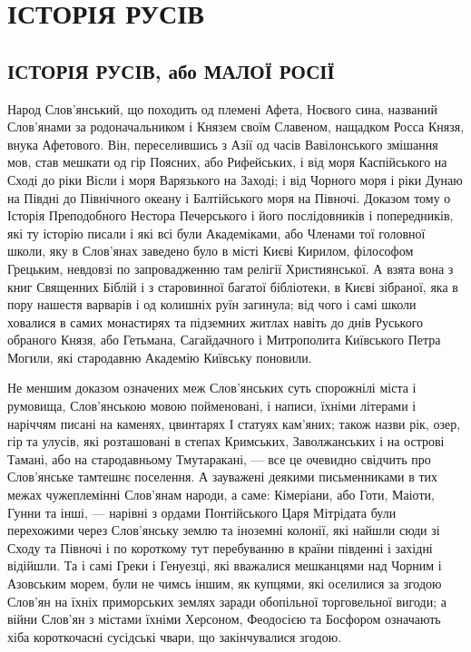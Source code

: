  
 
 
 
 

\chapter{ІСТОРІЯ РУСІВ}
\label{sec:books.istoria_rusiv}




\section{ІСТОРІЯ РУСІВ, або МАЛОЇ РОСІЇ}

Народ Слов'янський, що походить од племені Афета, Ноєвого сина, названий
Слов'янами за родоначальником і Князем своїм Славеном, нащадком Росса Князя,
внука Афетового. Він, переселившись з Азії од часів Вавілонського змішання мов,
став мешкати од гір Поясних, або Рифейських, і від моря Каспійського на Сході
до ріки Вісли і моря Варязького на Заході; і від Чорного моря і ріки Дунаю на
Півдні до Північного океану і Балтійського моря на Півночі. Доказом тому о
Історія Преподобного Нестора Печерського і його послідовників і попередників,
які ту історію писали і які всі були Академіками, або Членами тої головної
школи, яку в Слов'янах заведено було в місті Києві Кирилом, філософом Грецьким,
невдовзі по запровадженню там релігії Християнської. А взята вона з книг
Священних Біблій і з старовинної багатої бібліотеки, в Києві зібраної, яка в
пору нашестя варварів і од колишніх руїн загинула; від чого і самі школи
ховалися в самих монастирях та підземних житлах навіть до днів Руського
обраного Князя, або Гетьмана, Сагайдачного і Митрополита Київського Петра
Могили, які стародавню Академію Київську поновили.

Не меншим доказом означених меж Слов'янських суть спорожнілі міста і румовища,
Слов'янською мовою пойменовані, і написи, їхніми літерами і наріччям писані на
каменях, цвинтарях І статуях кам'яних; також назви рік, озер, гір та улусів,
які розташовані в степах Кримських, Заволжанських і на острові Тамані, або на
стародавньому Тмутаракані, — все це очевидно свідчить про Слов'янське тамтешнє
поселення. А зауважені деякими письменниками в тих межах чужеплемінні Слов'янам
народи, а саме: Кімеріани, або Готи, Маіоти, Гунни та інші, — нарівні з ордами
Понтійського Царя Мітрідата були перехожими через Слов'янську землю та іноземні
колонії, які найшли сюди зі Сходу та Півночі і по короткому тут перебуванню в
країни південні і західні відійшли. Та і самі Греки і Генуезці, які вважалися
мешканцями над Чорним і Азовським морем, були не чимсь іншим, як купцями, які
оселилися за згодою Слов'ян на їхніх приморських землях заради обопільної
торговельної вигоди; а війни Слов'ян з містами їхніми Херсоном, Феодосією та
Босфором означають хіба короткочасні сусідські чвари, що закінчувалися згодою.


